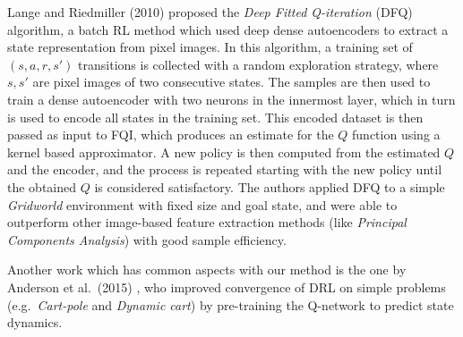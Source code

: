 Lange and Riedmiller (2010) \cite{lange2010deep} proposed the \textit{Deep 
Fitted Q-iteration} (DFQ) algorithm, a batch RL method which used deep dense 
autoencoders to extract a state representation from pixel images. 
In this algorithm, a training set of $(s, a, r, s')$ transitions is collected
with a random exploration strategy, where $s, s'$ are pixel images of two 
consecutive states. The samples are then used to train a dense autoencoder with 
two neurons in the innermost layer, which in turn is used to encode all states 
in the training set. This encoded dataset is then passed as input to FQI, 
which produces an estimate for the $Q$ function using a kernel based 
approximator. A new policy is then computed from the estimated $Q$ and the 
encoder, and the process is repeated starting with the new policy until the 
obtained $Q$ is considered satisfactory.
The authors applied DFQ to a simple \textit{Gridworld} environment with fixed 
size and goal state, and were able to outperform other image-based feature
extraction methods (like \textit{Principal Components Analysis}) with good
sample efficiency.

Another work which has common aspects with our method is the one by Anderson et
al.\ (2015) \cite{anderson2015faster}, who improved convergence of DRL on 
simple problems (e.g.\ \textit{Cart-pole} and \textit{Dynamic cart}) by 
pre-training the Q-network to predict state dynamics.


























